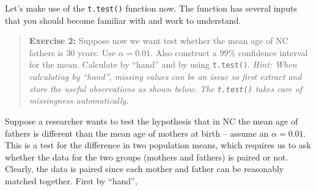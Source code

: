 \documentclass[]{book}
\newenvironment{Shaded}{\begin{snugshade}}{\end{snugshade}}
\newcommand{\CommentTok}[1]{\textcolor[rgb]{0.56,0.35,0.01}{\textit{#1}}}
\newcommand{\DataTypeTok}[1]{\textcolor[rgb]{0.13,0.29,0.53}{#1}}
\newcommand{\FloatTok}[1]{\textcolor[rgb]{0.00,0.00,0.81}{#1}}
\newcommand{\KeywordTok}[1]{\textcolor[rgb]{0.13,0.29,0.53}{\textbf{#1}}}
\newcommand{\NormalTok}[1]{#1}
\newcommand{\OperatorTok}[1]{\textcolor[rgb]{0.81,0.36,0.00}{\textbf{#1}}}
\newcommand{\StringTok}[1]{\textcolor[rgb]{0.31,0.60,0.02}{#1}}
\theoremstyle{definition}
\theoremstyle{definition}
\theoremstyle{definition}
\theoremstyle{remark}
\begin{document}
Let's make use of the \texttt{t.test()} function now. The function has
several inputs that you should become familiar with and work to
understand.

\begin{Shaded}
\end{Shaded}

\begin{quote}
\textbf{Exercise 2:} Suppose now we want test whether the mean age of NC
fathers is 30 years. Use \(\alpha = 0.01\). Also construct a 99\%
confidence interval for the mean. Calculate by ``hand'' and by using
\texttt{t.test()}. \emph{Hint: When calculating by ``hand'', missing
values can be an issue so first extract and store the useful
observations as shown below. The \texttt{t.test()} takes care of
missingness automatically.}
\end{quote}

\begin{Shaded}
\end{Shaded}

Suppose a researcher wants to test the hypothesis that in NC the mean
age of fathers is different than the mean age of mothers at birth --
assume an \(\alpha = 0.01\). This is a test for the difference in two
population means, which requires us to ask whether the data for the two
groups (mothers and fathers) is paired or not. Clearly, the data is
paired since each mother and father can be reasonably matched together.
First by ``hand'',
\end{document}
